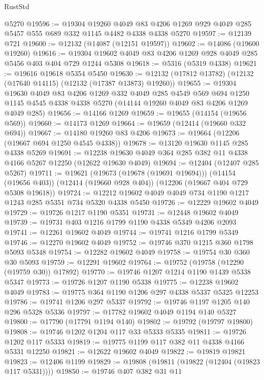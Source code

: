 \begin{lexlean}{RustStd}
\begin{coremodule}
    @5270
@19596 := @19304
    @19260
    @4049
    @83
    @4206
    @1269
    @929
    @4049
    @285
    @5457
    @555
    @689
    @332
    @1145
    @4482
    @4338
    @4338
    @5270
@19597 := @12139 @721
@19600 := @12132 (@14087 (@12151 @19597))
@19602 := @14086 (@19600 @19260)
@19616 := @19304 @19602 @4049 @83 @4206 @1269 @928 @4049 @285 @5456 @403 @404 @729 @1244 @5308
@19618 := @5316 (@5319 @4338)
@19621 := @19616 @19618 @5354 @5450
@19630 := @12132 (@17812 @13782) (@12132 (@17640 @14115) (@12132 (@17387 @13873) @19260))
@19655 := @19304
    @19630
    @4049
    @83
    @4206
    @1269
    @332
    @4049
    @285
    @4549
    @569
    @694
    @1250
    @1145
    @4545
    @4338
    @4338
    @5270
    (@14144 @19260 @4049 @83 @4206 @1269 @4049 @285)
@19656 := @14166 @1269
@19659 := @19655 (@14154 (@19656 @569))
@19660 := @14173 @1269
@19664 := @19659 (@12414 (@19660 @332 @694))
@19667 := @14180 @19260 @83 @4206
@19673 := @19664 (@12206 (@19667 @694 @1250 @4545 @4338))
@19678 := @13120 @19630 @1145 @285 @4338 @5269
@19691 := @12238 @19630 @4049 @364 @285 @382 @11 @4338 @4166 @5267 @12250 (@12622 @19630 @4049)
@19694 := @12404 (@12407 @285 @5267)
@19711 := @19621
    (@19673 (@19678 (@19691 @19694)))
    (@14154 (@19656 @403))
    (@12414 (@19660 @928 @404))
    (@12206 (@19667 @404 @729 @5308 @19618))
@19724 := @12212 @19602 @4049 @4049 @734 @1190 @1217 @1243 @285 @5351 @734 @5320 @4338 @5450
@19726 := @12229 @19602 @4049
@19729 := @19726 @1217 @1190 @5351
@19731 := @12448 @19602 @4049
@19739 := @19731 @403 @1216 @1799 @1190 @4338 @5349 @4206 @2093
@19741 := @12261 @19602 @4049
@19744 := @19741 @1216 @1799 @5349
@19746 := @12270 @19602 @4049
@19752 := @19746 @370 @1215 @360 @1798 @5093 @5348
@19754 := @12282 @19602 @4049
@19758 := @19754 @30 @360 @30 @5093
@19759 := @12291 @19602
@19764 := @19752 (@19758 (@12290 (@19759 @30)) @17892)
@19770 := @19746 @1207 @1214 @1190 @1439 @5338 @5347
@19773 := @19726 @1207 @1190 @5338
@19775 := @12238 @19602 @4049
@19783 := @19775 @364 @1190 @1206 @297 @4338 @5337 @5325 @12253
@19786 := @19741 @1206 @297 @5337
@19792 := @19746 @1197 @1205 @140 @296 @5328 @5336
@19797 := @17782 @19602 @4049 @1194 @140 @5327
@19800 := @17790 (@17791 @1194 @140)
@19802 := @19792 (@19797 @19800)
@19808 := @19746 @1202 @1204 @117 @33 @5333 @5335
@19811 := @19726 @1202 @117 @5333
@19819 := @19775 @1199 @117 @382 @11 @4338 @4166 @5331 @12250
@19821 := @12622 @19602 @4049
@19822 := @19819 @19821
@19823 := @12406 @1199
@19829 := @19808 (@19811 (@19822 (@12404 (@19823 @117 @5331))))
@19850 := @19746
    @407
    @382
    @31
    @11

\end{coremodule}
\end{lexlean}
